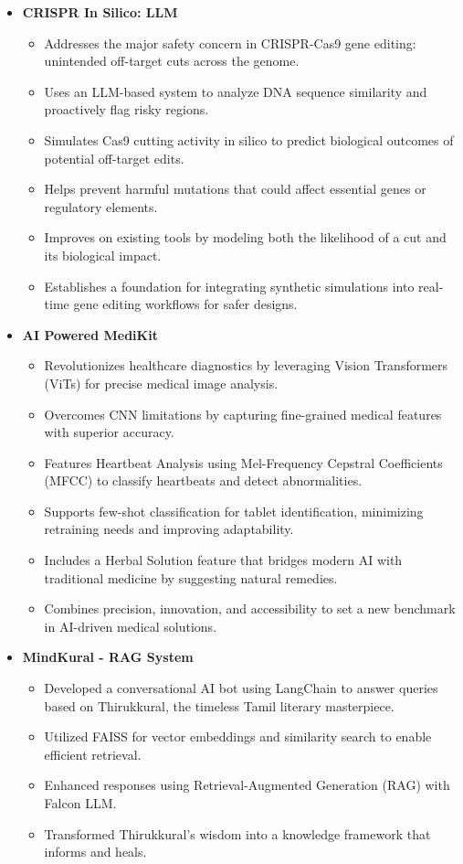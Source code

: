 \documentclass[letterpaper,11pt]{article}
\newcommand{\resitem}[1]{\item #1 \vspace{-2pt}}
\newcommand{\resheading}[1]{\textbf{\sffamily{\mbox{~}{\large #1} \vphantom{p\^{E}}}}}
\begin{document}
\resheading{Projects}
\begin{itemize}

\item[]
\textbf{CRISPR In Silico: LLM}
\vspace{-3mm}
\begin{itemize}
	\resitem{Addresses the major safety concern in CRISPR-Cas9 gene editing: unintended off-target cuts across the genome.}
	\resitem{Uses an LLM-based system to analyze DNA sequence similarity and proactively flag risky regions.}
	\resitem{Simulates Cas9 cutting activity in silico to predict biological outcomes of potential off-target edits.}
	\resitem{Helps prevent harmful mutations that could affect essential genes or regulatory elements.}
	\resitem{Improves on existing tools by modeling both the likelihood of a cut and its biological impact.}
	\resitem{Establishes a foundation for integrating synthetic simulations into real-time gene editing workflows for safer designs.}
\end{itemize}
\newpage
\item[]
	\textbf{AI Powered MediKit}
	\vspace{-3mm}
	\begin{itemize}
		\resitem{Revolutionizes healthcare diagnostics by leveraging Vision Transformers (ViTs) for precise medical image analysis.}
		\resitem{Overcomes CNN limitations by capturing fine-grained medical features with superior accuracy.}
		\resitem{Features Heartbeat Analysis using Mel-Frequency Cepstral Coefficients (MFCC) to classify heartbeats and detect abnormalities.}
		\resitem{Supports few-shot classification for tablet identification, minimizing retraining needs and improving adaptability.}
		\resitem{Includes a Herbal Solution feature that bridges modern AI with traditional medicine by suggesting natural remedies.}
		\resitem{Combines precision, innovation, and accessibility to set a new benchmark in AI-driven medical solutions.}
	\end{itemize}
\item[]
	\textbf{MindKural - RAG System}
	\vspace{-3mm}
	\begin{itemize}
		\resitem{Developed a conversational AI bot using LangChain to answer queries based on Thirukkural, the timeless Tamil literary masterpiece.}
		\resitem{Utilized FAISS for vector embeddings and similarity search to enable efficient retrieval.}
		\resitem{Enhanced responses using Retrieval-Augmented Generation (RAG) with Falcon LLM.}
		\resitem{Transformed Thirukkural’s wisdom into a knowledge framework that informs and heals.}
	\end{itemize}


\end{itemize}
\end{document}
